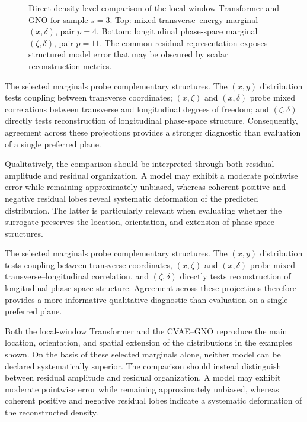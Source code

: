 \begin{figure}[p]
\centering
{}


\vspace{0.8em}


\caption{
Direct density-level comparison of the local-window Transformer and GNO for sample \(s=3\). Top: mixed transverse--energy marginal \((x,\delta)\), pair \(p=4\). Bottom: longitudinal phase-space marginal \((\zeta,\delta)\), pair \(p=11\). The common residual representation exposes structured model error that may be obscured by scalar reconstruction metrics.
}
\label{fig:tf_gno_comparison_xdelta_longitudinal}


\end{figure}

The selected marginals probe complementary structures. The \((x,y)\) distribution tests coupling between transverse coordinates; \((x,\zeta)\) and \((x,\delta)\) probe mixed correlations between transverse and longitudinal degrees of freedom; and \((\zeta,\delta)\) directly tests reconstruction of longitudinal phase-space structure. Consequently, agreement across these projections provides a stronger diagnostic than evaluation of a single preferred plane.

Qualitatively, the comparison should be interpreted through both residual amplitude and residual organization. A model may exhibit a moderate pointwise error while remaining approximately unbiased, whereas coherent positive and negative residual lobes reveal systematic deformation of the predicted distribution. The latter is particularly relevant when evaluating whether the surrogate preserves the location, orientation, and extension of phase-space structures.

The selected marginals probe complementary structures. The $(x,y)$ distribution tests coupling between transverse coordinates, $(x,\zeta)$ and $(x,\delta)$ probe mixed transverse--longitudinal correlation, and $(\zeta,\delta)$  directly tests reconstruction of longitudinal phase-space structure. Agreement across these projections therefore provides a more informative qualitative diagnostic than evaluation on a single preferred plane. 

Both the local-window Transformer and the CVAE--GNO reproduce the main location, orientation, and spatial extension of the distributions in the examples shown. On the basis of these selected marginals alone, neither model can be declared systematically superior. The comparison should instead distinguish between residual amplitude and residual organization. A model may exhibit moderate pointwise error while remaining approximately unbiased, whereas coherent positive and negative residual lobes indicate a systematic deformation of the reconstructed density.


